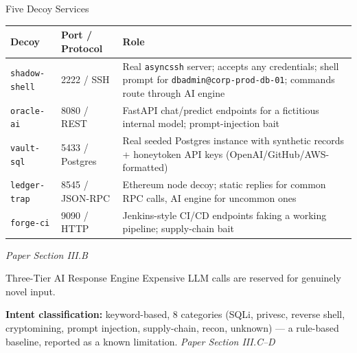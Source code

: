 \documentclass[aspectratio=169, 11pt]{beamer}
\newcommand{\srcnote}[1]{{\footnotesize\color{gray}\textit{#1}}}
\begin{document}
\begin{frame}{Five Decoy Services}
    \scriptsize
    \renewcommand{\arraystretch}{1.05}
    \setlength{\tabcolsep}{4pt}
    \begin{tabular}{|l|l|p{7.4cm}|}
        \hline
        \textbf{Decoy} & \textbf{Port / Protocol} & \textbf{Role} \\
        \hline
        \texttt{shadow-shell} & 2222 / SSH & Real \texttt{asyncssh} server; accepts any credentials; shell prompt for \texttt{dbadmin@corp-prod-db-01}; commands route through AI engine \\
        \hline
        \texttt{oracle-ai} & 8080 / REST & FastAPI chat/predict endpoints for a fictitious internal model; prompt-injection bait \\
        \hline
        \texttt{vault-sql} & 5433 / Postgres & Real seeded Postgres instance with synthetic records + honeytoken API keys (OpenAI/GitHub/AWS-formatted) \\
        \hline
        \texttt{ledger-trap} & 8545 / JSON-RPC & Ethereum node decoy; static replies for common RPC calls, AI engine for uncommon ones \\
        \hline
        \texttt{forge-ci} & 9090 / HTTP & Jenkins-style CI/CD endpoints faking a working pipeline; supply-chain bait \\
        \hline
    \end{tabular}
    \vspace{1mm}
    \srcnote{Paper Section III.B}
\end{frame}

\begin{frame}{Three-Tier AI Response Engine}
    Expensive LLM calls are reserved for genuinely novel input.
    \begin{center}
    \end{center}
    \vspace{2mm}
    \textbf{Intent classification:} keyword-based, 8 categories (SQLi, privesc, reverse shell, cryptomining, prompt injection, supply-chain, recon, unknown) --- a rule-based baseline, reported as a known limitation.
    \srcnote{Paper Section III.C--D}
\end{frame}
\end{document}
